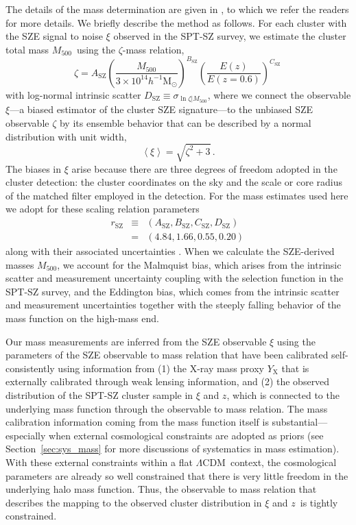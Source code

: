 \documentclass[useAMS,usenatbib,iop,numberedappendix]{mn2e}
\newcommand{\LCDM}{\ensuremath{\Lambda\textrm{CDM}}}
\newcommand{\Msun}{\ensuremath{\mathrm{M}_{\odot}}}
\newcommand{\Mfiveoo}{\ensuremath{M_{500}}}
\newcommand{\redshift}{\ensuremath{z}}
\newcommand{\Asz}{\ensuremath{A_{\mathrm{SZ}}}}
\newcommand{\Bsz}{\ensuremath{B_{\mathrm{SZ}}}}
\newcommand{\Csz}{\ensuremath{C_{\mathrm{SZ}}}}
\newcommand{\Dsz}{\ensuremath{D_{\mathrm{SZ}}}}
\newcommand{\Dszcom}{\ensuremath{\sigma_{\ln \zeta|M_{500}}}}
\begin{document}
The details of the mass determination are given in \cite{bocquet15}, to which we refer the readers for more details.
We briefly describe the method as follows.  For each cluster with the SZE signal to noise $\xi$ observed in the SPT-SZ survey, we estimate the cluster total mass \Mfiveoo\ using the $\zeta$-mass relation,
%
\begin{equation}
\label{eq:zeta2mass}
\zeta = \Asz 
\left( \frac{\Mfiveoo}{3\times10^{14}h^{-1}\Msun}  \right)^{\Bsz}
\left( \frac{E(\redshift)}{E(\redshift = 0.6)} \right)^{\Csz} \, 
\end{equation}
%
with log-normal intrinsic scatter $\Dsz\equiv\Dszcom$, where we connect the observable $\xi$---a biased estimator of the cluster SZE signature---to the unbiased SZE observable $\zeta$ by its ensemble behavior that can be described by a normal distribution with unit width,
%
\begin{equation}
\label{eq:xi2zeta}
\left\langle \xi \right\rangle = \sqrt{\zeta^2 + 3} \, .
\end{equation}
%
The biases in $\xi$ arise because there are three degrees of freedom adopted in the cluster detection:  the cluster coordinates on the sky and the scale or core radius of the matched filter employed in the detection.  For the mass estimates used here we adopt for these scaling relation parameters 
%
\begin{eqnarray}
\label{eq:params_sz}
r_{\mathrm{SZ}} &\equiv &\left( \Asz, \Bsz, \Csz, \Dsz \right) \, \nonumber \\
 &= &\left( 4.84, 1.66, 0.55, 0.20 \right) \,
\end{eqnarray}
%
along with their associated uncertainties \citep{dehaan16}.  When we calculate the SZE-derived masses \Mfiveoo, we account for the Malmquist bias, which arises from the intrinsic scatter and measurement uncertainty coupling with the selection function in the SPT-SZ survey, and the Eddington bias, which comes from the intrinsic scatter and measurement uncertainties together with the steeply falling behavior of the mass function on the high-mass end.  

Our mass measurements are inferred from the SZE observable $\xi$ using the parameters of the SZE observable to mass relation that have been calibrated self-consistently using information from (1) the X-ray mass proxy $Y_{\mathrm{X}}$ that is externally calibrated through weak lensing information, and (2) the observed distribution of the SPT-SZ cluster sample in $\xi$ and \redshift, which is connected to the underlying mass function through the observable to mass relation.  The mass calibration information coming from the mass function itself is substantial---especially when external cosmological constraints are adopted as priors (see Section~\ref{sec:sys_mass} for more discussions of systematics in mass estimation).  
With these external constraints within a flat \LCDM\ context, the cosmological parameters are already so well constrained that there is very little freedom in the underlying halo mass function.  Thus, the observable to mass relation that describes the mapping to the observed cluster distribution in $\xi$ and \redshift\ is tightly constrained.
\end{document}
